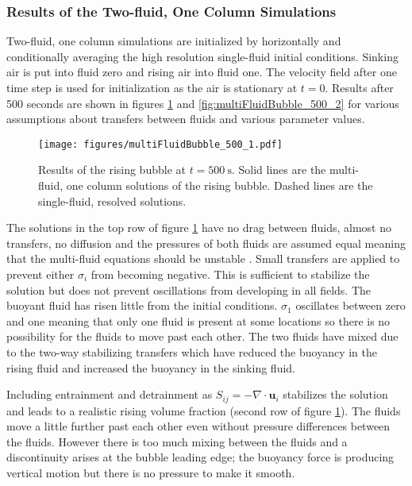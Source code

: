 \documentclass[draft]{agujournal2019}
\begin{document}
\subsubsection{Results of the Two-fluid, One Column Simulations}

Two-fluid, one column simulations are initialized by horizontally
and conditionally averaging the high resolution single-fluid initial
conditions. Sinking air is put into fluid zero and rising air into
fluid one. The velocity field after one time step is used for initialization
as the air is stationary at $t=0$. Results after 500 seconds are shown in figures \ref{fig:multiFluidBubble_500_1}
and \ref{fig:multiFluidBubble_500_2} for various assumptions about
transfers between fluids and various parameter values.

\begin{figure}
\noindent
\texttt{[image: figures/multiFluidBubble\_500\_1.pdf]}
\caption{\label{fig:multiFluidBubble_500_1} Results of the rising bubble at $t=500\ \text{s}$. Solid lines are the multi-fluid, one column solutions of the rising bubble. Dashed lines are the single-fluid, resolved solutions.}
\end{figure}

The solutions in the top row of figure {\protect\ref{fig:multiFluidBubble_500_1}} have
no drag between fluids, almost no transfers, no diffusion and
the pressures of both fluids are assumed equal meaning that the multi-fluid equations should be unstable \cite{TEB19}. 
Small transfers are applied
to prevent either $\sigma_{i}$ from becoming negative. This is sufficient to stabilize the solution but does not prevent oscillations from developing in all fields. The buoyant fluid has risen little from the initial conditions. $\sigma_1$ oscillates between zero and one meaning that only one fluid is present at some locations so there is no possibility for the fluids to move past each other.
The two fluids have mixed due to the two-way stabilizing transfers which have reduced the buoyancy in the rising fluid and increased the buoyancy in the sinking fluid.

Including entrainment and detrainment as $S_{ij}=-\nabla\cdot\mathbf{u}_{i}$ stabilizes the solution and
leads to a realistic rising volume fraction (second row of
figure \ref{fig:multiFluidBubble_500_1}).
The fluids move a little further past each other
even without pressure differences between the fluids. However there is too much mixing between the fluids
and a discontinuity arises at the bubble leading edge; the buoyancy force is producing vertical motion but there is no pressure to make it smooth. 
\end{document}

